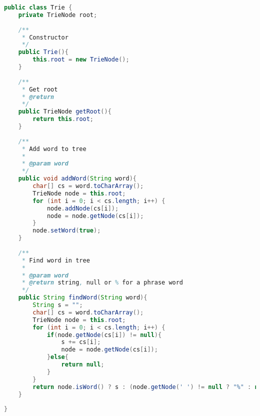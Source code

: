 \begin{lstlisting}[language=Java,basicstyle=\tiny,caption=Trie.java]
public class Trie {
    private TrieNode root;
    
    /**
     * Constructor
     */
    public Trie(){
        this.root = new TrieNode();
    }
    
    /**
     * Get root
     * @return 
     */
    public TrieNode getRoot(){
        return this.root;
    }
    
    /**
     * Add word to tree
     * 
     * @param word 
     */
    public void addWord(String word){
        char[] cs = word.toCharArray();
        TrieNode node = this.root;
        for (int i = 0; i < cs.length; i++) {
            node.addNode(cs[i]);
            node = node.getNode(cs[i]);
        }
        node.setWord(true);
    }
    
    /**
     * Find word in tree
     * 
     * @param word
     * @return string, null or % for a phrase word
     */
    public String findWord(String word){
        String s = "";
        char[] cs = word.toCharArray();
        TrieNode node = this.root;
        for (int i = 0; i < cs.length; i++) {
            if(node.getNode(cs[i]) != null){
                s += cs[i];
                node = node.getNode(cs[i]);
            }else{
                return null;
            }
        }
        return node.isWord() ? s : (node.getNode(' ') != null ? "%" : null);
    }
    
}
\end{lstlisting}

